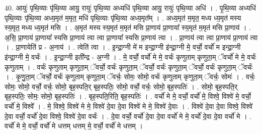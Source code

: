 \documentclass[17pt]{extarticle}
\begin{document}
40. आयुः॑ पृथि॒व्याः पृ॑थि॒व्या आयु॒ रायुः॑ पृथि॒व्या अध्यधि॑ पृथि॒व्या आयु॒ रायुः॑ पृथि॒व्या अधि॑ । . पृ॒थि॒व्या अध्यधि॑ पृथि॒व्याः पृ॑थि॒व्या अध्य॒मृत॑ म॒मृत॒ मधि॑ पृथि॒व्याः पृ॑थि॒व्या अध्य॒मृत᳚म् । . अध्य॒मृत॑ म॒मृत॒ मध्य ध्य॒मृत॑ मस्य स्य॒मृत॒ मध्य ध्य॒मृत॑ मसि । . अ॒मृत॑ मस्य स्य॒मृत॑ म॒मृत॑ मसि प्रा॒णाय॑ प्रा॒णाया᳚ स्य॒मृत॑ म॒मृत॑ मसि प्रा॒णाय॑ । . अ॒सि॒ प्रा॒णाय॑ प्रा॒णाया᳚ स्यसि प्रा॒णाय॑ त्वा त्वा प्रा॒णाया᳚ स्यसि प्रा॒णाय॑ त्वा । . प्रा॒णाय॑ त्वा त्वा प्रा॒णाय॑ प्रा॒णाय॑ त्वा । . प्रा॒णायेति॑ प्र - अ॒नाय॑ । . त्वेति॑ त्वा । . इ॒न्द्रा॒ग्नी मे॑ म इन्द्रा॒ग्नी इ॑न्द्रा॒ग्नी मे॒ वर्चो॒ वर्चो॑ म इन्द्रा॒ग्नी इ॑न्द्रा॒ग्नी मे॒ वर्चः॑ । . इ॒न्द्रा॒ग्नी इती᳚न्द्र - अ॒ग्नी । . मे॒ वर्चो॒ वर्चो॑ मे मे॒ वर्चः॑ कृणुताम् कृणुता॒म् ॅवर्चो॑ मे मे॒ वर्चः॑ कृणुताम् । . वर्चः॑ कृणुताम् कृणुता॒म् ॅवर्चो॒ वर्चः॑ कृणुता॒म् ॅवर्चो॒ वर्चः॑ कृणुता॒म् ॅवर्चो॒ वर्चः॑ कृणुता॒म् ॅवर्चः॑ । . कृ॒णु॒ता॒म् ॅवर्चो॒ वर्चः॑ कृणुताम् कृणुता॒म् ॅवर्चः॒ सोमः॒ सोमो॒ वर्चः॑ कृणुताम् कृणुता॒म् ॅवर्चः॒ सोमः॑ । . वर्चः॒ सोमः॒ सोमो॒ वर्चो॒ वर्चः॒ सोमो॒ बृह॒स्पति॒र् बृह॒स्पतिः॒ सोमो॒ वर्चो॒ वर्चः॒ सोमो॒ बृह॒स्पतिः॑ । . सोमो॒ बृह॒स्पति॒र् बृह॒स्पतिः॒ सोमः॒ सोमो॒ बृह॒स्पतिः॑ । . बृह॒स्पति॒रिति॒ बृह॒स्पतिः॑ । . वर्चो॑ मे मे॒ वर्चो॒ वर्चो॑ मे॒ विश्वे॒ विश्वे॑ मे॒ वर्चो॒ वर्चो॑ मे॒ विश्वे᳚ । . मे॒ विश्वे॒ विश्वे॑ मे मे॒ विश्वे॑ दे॒वा दे॒वा विश्वे॑ मे मे॒ विश्वे॑ दे॒वाः । . विश्वे॑ दे॒वा दे॒वा विश्वे॒ विश्वे॑ दे॒वा वर्चो॒ वर्चो॑ दे॒वा विश्वे॒ विश्वे॑ दे॒वा वर्चः॑ । . दे॒वा वर्चो॒ वर्चो॑ दे॒वा दे॒वा वर्चो॑ मे मे॒ वर्चो॑ दे॒वा दे॒वा वर्चो॑ मे । . वर्चो॑ मे मे॒ वर्चो॒ वर्चो॑ मे धत्तम् धत्तम् मे॒ वर्चो॒ वर्चो॑ मे धत्तम् । \newline
\end{document}
